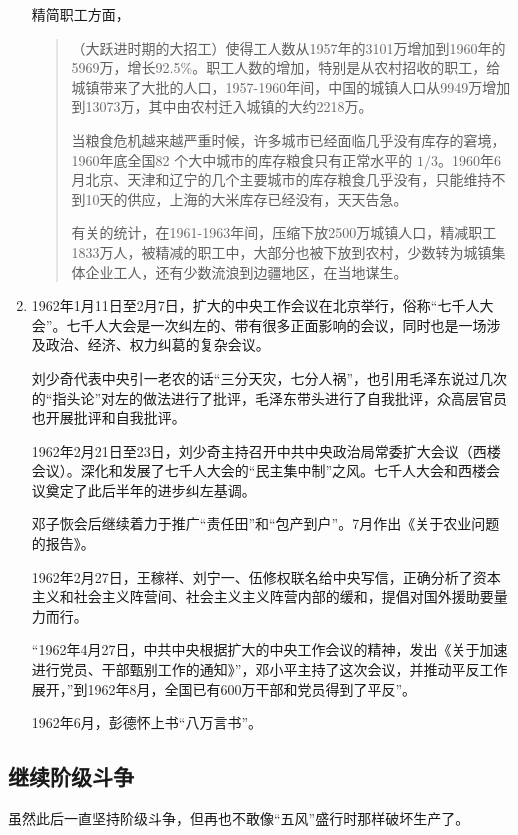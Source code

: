 \begin{enumerate}
  精简职工方面，
  \begin{quotation}（大跃进时期的大招工）使得工人数从1957年的3101万增加到1960年的5969万，增长92.5\%。职工人数的增加，特别是从农村招收的职工，给城镇带来了大批的人口，1957-1960年间，中国的城镇人口从9949万增加到13073万，其中由农村迁入城镇的大约2218万。

    当粮食危机越来越严重时候，许多城市已经面临几乎没有库存的窘境，1960年底全国82
    个大中城市的库存粮食只有正常水平的 $1/3$。1960年6月北京、天津和辽宁的几个主要城市的库存粮食几乎没有，只能维持不到10天的供应，上海的大米库存已经没有，天天告急。

    有关的统计，在1961-1963年间，压缩下放2500万城镇人口，精减职工1833万人，被精减的职工中，大部分也被下放到农村，少数转为城镇集体企业工人，还有少数流浪到边疆地区，在当地谋生。\cite{jingjianzhigong}
  \end{quotation}

\item 1962年1月11日至2月7日，扩大的中央工作会议在北京举行，俗称“七千人大会”。七千人大会是一次纠左的、带有很多正面影响的会议，同时也是一场涉及政治、经济、权力纠葛的复杂会议。

  刘少奇代表中央引一老农的话“三分天灾，七分人祸”，也引用毛泽东说过几次的“指头论”对左的做法进行了批评，毛泽东带头进行了自我批评，众高层官员也开展批评和自我批评。

  1962年2月21日至23日，刘少奇主持召开中共中央政治局常委扩大会议（西楼会议）。深化和发展了七千人大会的“民主集中制”之风。七千人大会和西楼会议奠定了此后半年的进步纠左基调。

  邓子恢会后继续着力于推广“责任田”和“包产到户”。7月作出《关于农业问题的报告》。

  1962年2月27日，王稼祥、刘宁一、伍修权联名给中央写信，正确分析了资本主义和社会主义阵营间、社会主义主义阵营内部的缓和，提倡对国外援助要量力而行。

  “1962年4月27日，中共中央根据扩大的中央工作会议的精神，发出《关于加速进行党员、干部甄别工作的通知》”，邓小平主持了这次会议，并推动平反工作展开，”到1962年8月，全国已有600万干部和党员得到了平反”。

  1962年6月，彭德怀上书“八万言书”。

\end{enumerate}

\subsection{继续阶级斗争}

虽然此后一直坚持阶级斗争，但再也不敢像“五风”盛行时那样破坏生产了。

